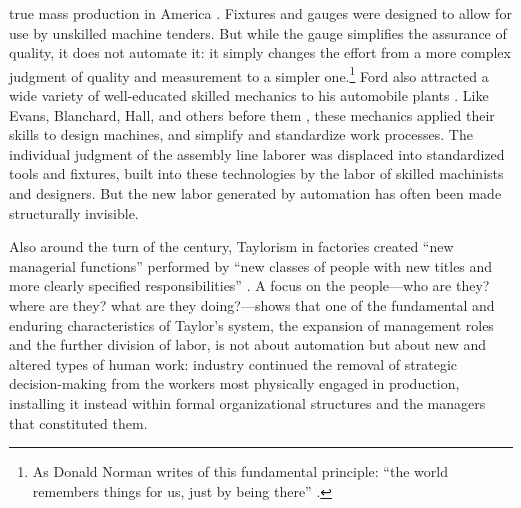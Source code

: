 true mass production in America \cite[p. 217]{hounshell}. Fixtures
and gauges were designed to allow for use by unskilled machine
tenders.
 But while the gauge simplifies the
assurance  of quality, it does not
automate it:  it simply changes the effort from a more complex judgment
of quality and measurement to a simpler one.\footnote{As Donald
Norman writes of this fundamental principle: ``the world remembers things for us, just by being
there'' \cite[p. 147]{normanThings}.} Ford also attracted a wide
variety of well-educated skilled mechanics 
to his automobile plants \cite[p. 223]{hounshell}. Like Evans, Blanchard, Hall, and others
before them \cite{roesmithHarpers}, these mechanics applied their skills to design machines,
and simplify and standardize work processes. The individual judgment
of the assembly line laborer was displaced into standardized tools and
fixtures, built into these technologies by the labor of skilled
machinists and designers. But the new labor generated by automation
has often
been made structurally invisible.


Also around the turn of the century, Taylorism in factories created ``new managerial
functions'' performed by ``new classes of people with new titles and
more clearly specified responsibilities'' \cite[p. 120]{aitken}. A focus on the
people---who are they? where are they? what are they doing?---shows that
one of the fundamental and enduring characteristics of Taylor's
system, the expansion of management roles and the further division of
labor, is not about automation but about new and altered
types of human work: industry continued
the removal of strategic decision-making from the
workers most physically engaged in production, installing it
instead within formal organizational structures and the managers that
constituted them. 



